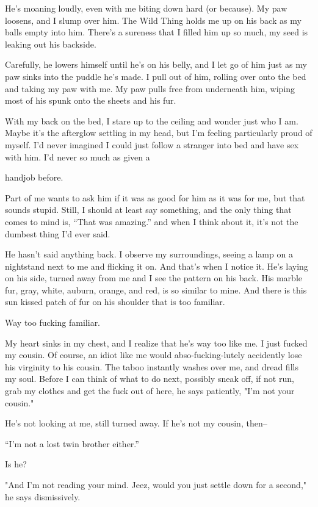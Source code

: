 He's moaning loudly, even with me biting down hard (or because). My paw
loosens, and I slump over him. The Wild Thing holds me up on his back as
my balls empty into him. There's a sureness that I filled him up so
much, my seed is leaking out his backside.

Carefully, he lowers himself until he's on his belly, and I let go of
him just as my paw sinks into the puddle he's made. I pull out of him,
rolling over onto the bed and taking my paw with me. My paw pulls free
from underneath him, wiping most of his spunk onto the sheets and his
fur.

With my back on the bed, I stare up to the ceiling and wonder just who I
am. Maybe it's the afterglow settling in my head, but I'm feeling
particularly proud of myself. I'd never imagined I could just follow a
stranger into bed and have sex with him. I'd never so much as given a

handjob before.

Part of me wants to ask him if it was as good for him as it was for me,
but that sounds stupid. Still, I should at least say something, and the
only thing that comes to mind is, ``That was amazing.'' and when I think
about it, it's not the dumbest thing I'd ever said.

He hasn't said anything back. I observe my surroundings, seeing a lamp
on a nightstand next to me and flicking it on. And that's when I notice
it. He's laying on his side, turned away from me and I see the pattern
on his back. His marble fur, gray, white, auburn, orange, and red, is so
similar to mine. And there is this sun kissed patch of fur on his
shoulder that is too familiar.

Way too fucking familiar.

My heart sinks in my chest, and I realize that he's way too like me. I
just fucked my cousin. Of course, an idiot like me would
abso-fucking-lutely accidently lose his virginity to his cousin. The
taboo instantly washes over me, and dread fills my soul. Before I can
think of what to do next, possibly sneak off, if not run, grab my
clothes and get the fuck out of here, he says patiently, "I'm not your
cousin."

He's not looking at me, still turned away. If he's not my cousin,
then--

``I'm not a lost twin brother either.''

Is he?

"And I'm not reading your mind. Jeez, would you just settle down for a
second," he says dismissively.

